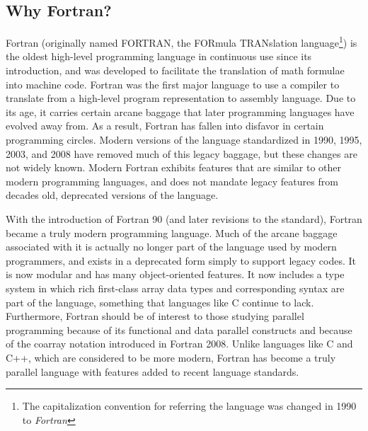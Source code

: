 

\subsection{Why Fortran?}

Fortran (originally named FORTRAN, the FORmula TRANslation
language\footnote{The capitalization convention for referring the
  language was changed in 1990 to \emph{Fortran}}) is the oldest
high-level programming language in continuous use since its
introduction, and was developed to facilitate the translation of math
formulae into machine code. Fortran was the first major language to
use a compiler to translate from a high-level program representation
to assembly language. Due to its age, it carries certain arcane
baggage that later programming languages have evolved away from. As a
result, Fortran has fallen into disfavor in certain programming
circles.  Modern versions of the language standardized in 1990, 1995, 2003, and 2008
have removed much of this legacy baggage, but these changes are not
widely known.  Modern Fortran exhibits features that are similar to 
other modern programming languages, and does not mandate legacy features
from decades old, deprecated versions of the language.

With the introduction of Fortran 90 (and later revisions to the
standard), Fortran became a truly modern programming language. Much of
the arcane baggage associated with it is actually no longer part of
the language used by modern programmers, and exists in a deprecated
form simply to support legacy codes. It is now modular and has many
object-oriented features.  It now includes a type system in which rich
first-class array data types and corresponding syntax are part of the
language, something that languages like C continue to lack.
Furthermore, Fortran should be of interest to those studying parallel
programming because of its functional and data parallel constructs and
because of the coarray notation introduced in Fortran 2008. Unlike
languages like C and C++, which are considered to be more modern,
Fortran has become a truly parallel language with features added to
recent language standards.


